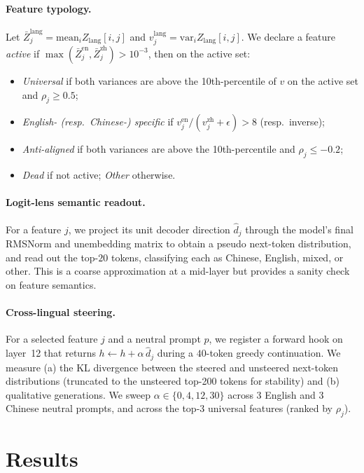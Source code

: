 \documentclass[11pt,a4paper]{article}
\begin{document}
\paragraph{Feature typology.} Let
$\bar Z^\text{lang}_j = \mathrm{mean}_i Z_\text{lang}[i, j]$ and
$v^\text{lang}_j = \mathrm{var}_i Z_\text{lang}[i, j]$. We declare a feature
\emph{active} if $\max(\bar Z^\text{en}_j, \bar Z^\text{zh}_j) > 10^{-3}$, then
on the active set:
\begin{itemize}
\item \emph{Universal} if both variances are above the 10th-percentile of
$v$ on the active set and $\rho_j \geq 0.5$;
\item \emph{English- (resp.\ Chinese-) specific} if
$v^\text{en}_j / (v^\text{zh}_j + \epsilon) > 8$ (resp.\ inverse);
\item \emph{Anti-aligned} if both variances are above the
10th-percentile and $\rho_j \leq -0.2$;
\item \emph{Dead} if not active; \emph{Other} otherwise.
\end{itemize}

\paragraph{Logit-lens semantic readout.} For a feature $j$, we project its
unit decoder direction $\hat d_j$ through the model's final RMSNorm and
unembedding matrix to obtain a pseudo next-token distribution, and read out
the top-$20$ tokens, classifying each as Chinese, English, mixed, or other.
This is a coarse approximation at a mid-layer but provides a sanity check on
feature semantics.

\paragraph{Cross-lingual steering.} For a selected feature $j$ and a neutral
prompt $p$, we register a forward hook on layer~12 that returns
$h \leftarrow h + \alpha\, \hat d_j$ during a $40$-token greedy continuation.
We measure (a) the KL divergence between the steered and unsteered
next-token distributions (truncated to the unsteered top-200 tokens for
stability) and (b) qualitative generations. We sweep $\alpha\in\{0,4,12,30\}$
across 3 English and 3 Chinese neutral prompts, and across the top-3 universal
features (ranked by $\rho_j$).

\section{Results}
\end{document}
